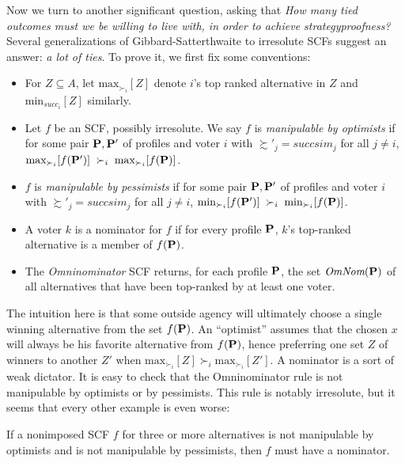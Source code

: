 Now we turn to another significant question, asking that \emph{How many tied outcomes must we be willing to live with, in order to achieve strategyproofness?} Several generalizations of Gibbard-Satterthwaite to irresolute SCFs suggest an answer: \emph{a lot of ties}. To prove it, we first fix some conventions:

\begin{definition}
    \begin{itemize}
        \item For $Z \subseteq A$, let $\mbox{max}_{\succ_i}[Z]$ denote $i$'s top ranked alternative in $Z$ and $\mbox{min}_{succ_i}[Z]$ similarly.
        \item Let $f$ be an SCF, possibly irresolute. We say $f$ is \emph{manipulable by optimists} if for some pair $\mathbf{P},\mathbf{P}'$ of profiles and voter $i$ with $\succsim'_j = succsim_j$ for all $j \neq i$, $\mbox{max}_{\succ_i} [f(\mathbf{P}')] \; \succ_i \; \mbox{max}_{\succ_i} [f(\mathbf{P})]$.
        \item $f$ is \emph{manipulable by pessimists} if for some pair $\mathbf{P},\mathbf{P}'$ of profiles and voter $i$ with $\succsim'_j = succsim_j$ for all $j \neq i$, $\mbox{min}_{\succ_i} [f(\mathbf{P}')] \; \succ_i \; \mbox{min}_{\succ_i} [f(\mathbf{P})]$.
        \item A voter $k$ is a nominator for $f$ if for every profile $\mathbf{P}$, $k$'s top-ranked alternative is a member of $f(\mathbf{P})$.
        \item The \emph{Omninominator} SCF returns, for each profile $\mathbf{P}$, the set $\textit{OmNom}(\mathbf{P})$ of all alternatives that have been top-ranked by at least one voter.
    \end{itemize}
\end{definition}

The intuition here is that some outside agency will ultimately choose a single winning alternative from the set $f(\mathbf{P})$. An ``optimist'' assumes that the chosen $x$ will always be his favorite alternative from $f(\mathbf{P})$, hence preferring one set $Z$ of winners to another $Z'$ when $\mbox{max}_{\succ_i}[Z] \succ_i \mbox{max}_{\succ_i}[Z']$. A nominator is a sort of weak dictator. It is easy to check that the Omninominator rule is not manipulable by optimists or by pessimists. This rule is notably irresolute, but it seems that every other example is even worse:

\begin{theorem}
    \label{nominator}
    If a nonimposed SCF $f$ for three or more alternatives is not manipulable by optimists and is not manipulable by pessimists, then $f$ must have a nominator.
\end{theorem}

